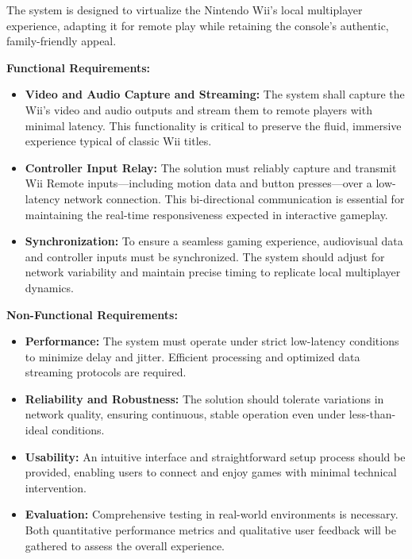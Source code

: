 \label{chapter:requirements}

The system is designed to virtualize the Nintendo Wii’s local multiplayer experience, adapting it for remote play while retaining the console’s authentic, family-friendly appeal.

\textbf{Functional Requirements:}
\begin{itemize}
	\item \textbf{Video and Audio Capture and Streaming:}
	      The system shall capture the Wii’s video and audio outputs and stream them to remote players with minimal latency. This functionality is critical to preserve the fluid, immersive experience typical of classic Wii titles.

	\item   \textbf{Controller Input Relay:}
	      The solution must reliably capture and transmit Wii Remote inputs—including motion data and button presses—over a low-latency network connection. This bi-directional communication is essential for maintaining the real-time responsiveness expected in interactive gameplay.

	\item    \textbf{Synchronization:}
	      To ensure a seamless gaming experience, audiovisual data and controller inputs must be synchronized. The system should adjust for network variability and maintain precise timing to replicate local multiplayer dynamics.


\end{itemize}


\textbf{Non-Functional Requirements:}
\begin{itemize}

	\item  \textbf{Performance:}
	      The system must operate under strict low-latency conditions to minimize delay and jitter. Efficient processing and optimized data streaming protocols are required.

	\item \textbf{Reliability and Robustness:}
	      The solution should tolerate variations in network quality, ensuring continuous, stable operation even under less-than-ideal conditions.

	\item \textbf{Usability:}
	      An intuitive interface and straightforward setup process should be provided, enabling users to connect and enjoy games with minimal technical intervention.

	\item \textbf{Evaluation:}
	      Comprehensive testing in real-world environments is necessary. Both quantitative performance metrics and qualitative user feedback will be gathered to assess the overall experience.


\end{itemize}
